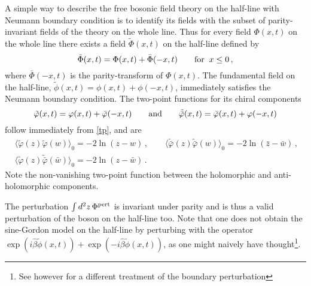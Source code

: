 \documentclass[a4paper,12pt]{article}
\newcommand{\hb}{\hat{\beta}}
\numberwithin{equation}{section}
\begin{document}
A simple way to describe the free bosonic field theory on the
half-line with Neumann boundary condition is to identify its
fields with the subset of parity-invariant fields of the theory on
the whole line. Thus for every field $\Phi(x,t)$ on the whole line
there exists a field $\tilde{\Phi}(x,t)$ on the half-line defined
by
\begin{equation}\label{hl}
\tilde{\Phi}(x,t) = \Phi(x,t)+\bar{\Phi}(-x,t)
\qquad {\rm for}\;\; x\leq 0\,,\end{equation} where
$\bar{\Phi}(-x,t)$ is the parity-transform of $\Phi(x,t)$. The
fundamental field on the half-line, $\tilde{\phi}(x,t) = \phi(x,t)
+ \phi(-x,t)$, immediately satisfies the Neumann boundary
condition. The two-point functions for its chiral components
\begin{equation} \tilde{\varphi}(x,t)= \varphi(x,t) +
\bar{\varphi}(-x,t) \qquad {\rm and} \qquad
\tilde{\bar{\varphi}}(x,t) = \bar{\varphi}(x,t) + \varphi(-x,t)
\end{equation} follow immediately from \eqref{tp}, and are \begin{eqnarray} & \langle
\tilde{\varphi}(z)  \tilde{\varphi}(w)\rangle_0 =
-2\ln(z-w)\,,\qquad \langle \tilde{\bar{\varphi}}(z)
\tilde{\bar{\varphi}}(w)\rangle_0 = -2\ln(\bar{z}-\bar{w})\,,&
\\ & \langle \tilde{\varphi}(z)
\tilde{\bar{\varphi}}(\bar{w})\rangle_0 = -2\ln(z-\bar{w})\,.&
\end{eqnarray}
Note the non-vanishing two-point function between the
holomorphic and anti-holomorphic components.

The perturbation $\int d^2z\,\Phi^{\rm pert}$ is invariant under
parity and is thus a valid perturbation of the boson on the
half-line too. Note that one does not obtain the sine-Gordon model
on the half-line by perturbing with the operator
$\exp(i\hb\tilde{\phi}(x,t))+\exp(-i\hb\tilde{\phi}(x,t))$, as one
might naively have thought\footnote{See however \cite[appendix
C]{Baj01} for a different treatment of the boundary perturbation}.
\end{document}
